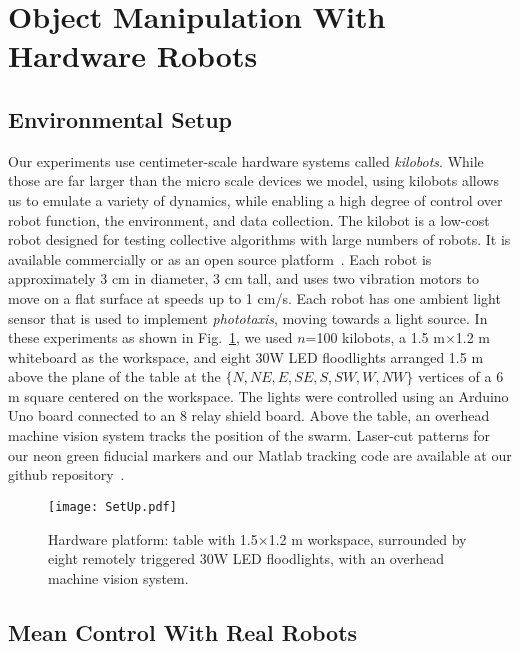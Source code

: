 
\section{Object Manipulation With Hardware Robots}\label{sec:realExperiment}

  
\subsection{Environmental Setup}
Our experiments use centimeter-scale hardware systems called \emph{kilobots}.  While those are far larger than the micro scale devices we model, using kilobots allows us to emulate a variety of dynamics, while enabling a high degree of control over robot function, the environment, and data collection. The kilobot \cite{Rubenstein2012,rubenstein2014programmable} is a low-cost robot designed for testing collective algorithms with large numbers of robots. It is available commercially or as an open source platform~\cite{K-Team2015}.  Each robot is approximately 3 cm in diameter, 3 cm tall, and uses two vibration motors to move on a flat surface at speeds up to 1 cm/s.  Each robot has one ambient light sensor that is used to implement \emph{phototaxis},  moving towards a light source. 
In these experiments as shown in Fig.~\ref{fig:setup}, we used $n$=100 kilobots, a 1.5 m$\times$1.2 m whiteboard as the workspace, and eight 30W LED floodlights arranged 1.5 m above the plane of the table at the $\{N,NE,E,SE,S,SW,W,NW\}$ vertices of a 6 m square centered on the workspace. The lights were controlled using an Arduino Uno board connected to an 8 relay shield board.  Above the table, an overhead machine vision system tracks the position of the swarm. Laser-cut patterns for our neon green fiducial markers and our {\sc Matlab} tracking code are available at our github repository~\cite{Shahrokhi2015GitHubShapeControl}.
\begin{figure}
\begin{center}
	\texttt{[image: SetUp.pdf]}
\end{center}
\caption{\label{fig:setup}
Hardware platform:  table with 1.5$\times$1.2 m workspace, surrounded by eight remotely triggered 30W LED floodlights, with an overhead machine vision system.
}
\end{figure}
\subsection{Mean Control With Real Robots}

